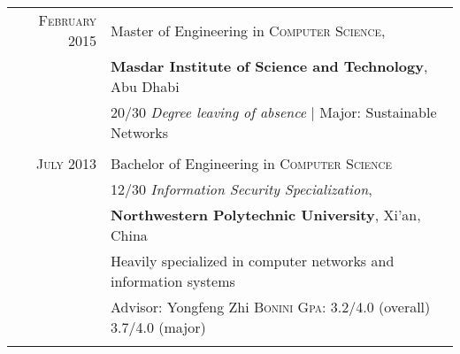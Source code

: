 \documentclass[a4paper,10pt]{article} %
\begin{document}
\begin{tabular}{rl}	
\textsc{February} 2015 & Master of Engineering in \textsc{Computer
  Science}, \\ & \textbf{Masdar Institute of Science and Technology}, Abu Dhabi\\
& 20/30 \small\emph{Degree leaving of absence} | Major: Sustainable Networks\\
&\\


\textsc{July} 2013 & Bachelor of Engineering in
\textsc{}\textsc{Computer Science} \\& 12/30 \small\emph{Information
  Security Specialization},\\ &\normalsize\textbf{Northwestern
  Polytechnic University},
  Xi'an, China\\
& Heavily specialized in computer networks and information systems \\
&  \small Advisor: Yongfeng Zhi \textsc{Bonini} \normalsize
\textsc{Gpa}: 3.2/4.0 (overall) 3.7/4.0 (major)%
\\ 
 & \\




\end{tabular}

\end{document}
